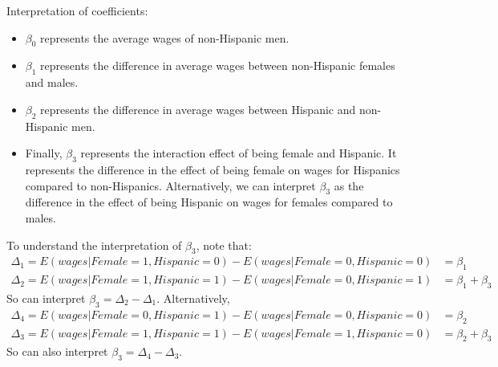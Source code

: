 \documentclass{./../../Latex/handout}
\begin{document}
Interpretation of coefficients: 
\begin{itemize}
\item $\beta_0$ represents the average wages of non-Hispanic men.
\item $\beta_1$ represents the difference in average wages between non-Hispanic females and males.
\item $\beta_2$ represents the difference in average wages between Hispanic and non-Hispanic men.
\item Finally, $\beta_3$ represents the interaction effect of being female and Hispanic. It represents the difference in the effect of being female on wages for Hispanics compared to non-Hispanics. Alternatively, we can interpret $\beta_3$ as the difference in the effect of being Hispanic on wages for females compared to males. \end{itemize}
To understand the interpretation of $\beta_3$, note that:
\begin{align*}
\Delta_1 = E(wages | Female=1, Hispanic=0)-E(wages | Female=0, Hispanic=0) &= \beta_1 \\
\Delta_2 = E(wages | Female=1, Hispanic=1)-E(wages | Female=0, Hispanic=1) &= \beta_1 + \beta_3 
\end{align*}
So can interpret $\beta_3 =\Delta_2 -\Delta_1 $. Alternatively,
\begin{align*}
\Delta_4 = E(wages | Female=0, Hispanic=1)-E(wages | Female=0, Hispanic=0) &= \beta_2 \\
\Delta_3 = E(wages | Female=1, Hispanic=1)-E(wages | Female=1, Hispanic=0) &= \beta_2 + \beta_3 
\end{align*}
So can also interpret $\beta_3 =\Delta_4 -\Delta_3 $.
\end{document}
